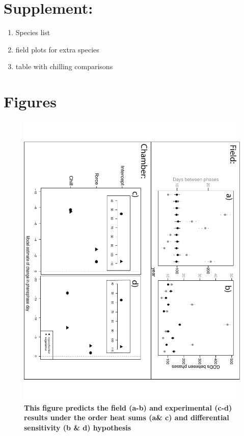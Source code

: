\documentclass[11pt]{article}
\begin{document}
\section*{Supplement:}
\begin{enumerate}
\item Species list
\item field plots for extra species
\item table with chilling comparisons
\end{enumerate}
 

\section{Figures}

\begin{figure}[h!]
\centering
 \includegraphics[width=.8\textwidth,angle =90]{..//Plots/Flobuds_manuscript_figs/simulationfigure.pdf}
   \caption{\textbf{This figure predicts the field (a-b) and experimental (c-d) results under the order heat sums (a\& c) and differential sensitivity (b \& d) hypothesis}}
    \label{fig:field}
\end{figure}
\end{document}
